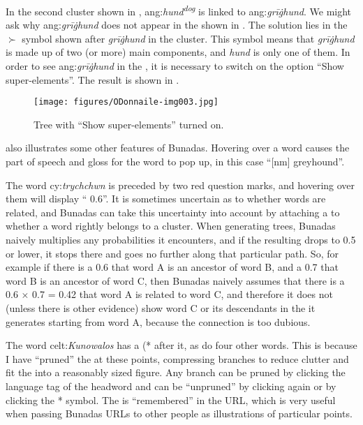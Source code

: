\documentclass[output=paper,colorlinks,citecolor=brown]{langscibook}
\begin{document}
In the second cluster shown in , ang:\textit{hund}\textit{\textsuperscript{dog}} is linked to ang:\textit{grī\.ghund}. We might ask why ang:\textit{grī\.ghund} does not appear in the  shown in . The solution lies in the ${\succ}$ symbol shown after \textit{grī\.ghund} in the cluster. This symbol means that \textit{grī\.ghund} is made up of two (or more) main components, and \textit{hund} is only one of them. In order to see ang:\textit{grī\.ghund} in the , it is necessary to switch on the option ``Show super-elements”. The result is shown in . 


\begin{figure}
\texttt{[image: figures/ODonnaile-img003.jpg]}
\caption{Tree with “Show super-elements” turned on.}
\label{fig:odonnaile:3}
\end{figure}

 also illustrates some other features of Bunadas. Hovering over a word causes the part of speech and gloss for the word to pop up, in this case ``[nm] greyhound”.

The word cy:\textit{trychchwn} is preceded by two red question marks, and hovering over them will display `` 0.6”. It is sometimes uncertain as to whether words are related, and Bunadas can take this uncertainty into account by attaching a  to whether a word rightly belongs to a cluster. When generating trees, Bunadas naively multiplies any probabilities it encounters, and if the resulting  drops to 0.5 or lower, it stops there and goes no further along that particular path. So, for example if there is a  0.6 that word A is an ancestor of word B, and a  0.7 that word B is an ancestor of word C, then Bunadas naively assumes that there is a  0.6 × 0.7 = 0.42 that word A is related to word C, and therefore it does not (unless there is other evidence) show word C or its descendants in the  it generates starting from word A, because the connection is too dubious.

The word celt:\textit{Kunowalos} has a (* after it, as do four other words. This is because I have ``pruned” the  at these points, compressing branches to reduce clutter and fit the  into a reasonably sized figure. Any branch can be pruned by clicking the language tag of the headword and can be ``unpruned” by clicking again or by clicking the * symbol. The  is “remembered” in the URL, which is very useful when passing Bunadas  URLs to other people as illustrations of particular points.
\end{document}
